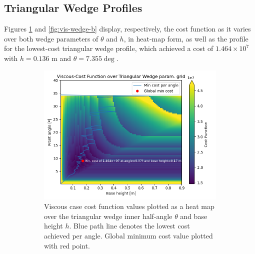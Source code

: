 \documentclass[11pt]{article}
\begin{document}
\subsection{Triangular Wedge Profiles}
Figures \ref{fig:vis-wedge-a} and \ref{fig:vis-wedge-b} display, respectively, the cost function as it varies over both wedge parameters of $\theta$ and $h$, in heat-map form, as well as the profile for the lowest-cost triangular wedge profile, which achieved a cost of $1.464 \times 10^7$ with $h=0.136 \text{ m}$ and $\theta=7.355\deg$.
\begin{figure}[H]
\centering
\begin{subfigure}[b]{0.54\textwidth}
    \centering
    \includegraphics[width=\linewidth]{../results/viscous/wedges.png}
    \caption{Viscous case cost function values plotted as a heat map over the triangular wedge inner half-angle $\theta$ and base height $h$. Blue path line denotes the lowest cost achieved per angle. Global minimum cost value plotted with red point.}
    \label{fig:vis-wedge-a}
\end{subfigure}
\hfill
\begin{subfigure}[b]{0.44\textwidth}
    \centering

\end{subfigure}
\end{figure}
\end{document}

